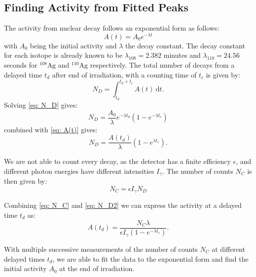 \subsection{Finding Activity from Fitted Peaks}
The activity from nuclear decay follows an exponential form as follows:
\begin{equation} \label{eq: A(t)}
  A(t) = A_0e^{-λt}
\end{equation}
with $A_0$ being the initial activity and $λ$ the decay constant. The decay constant for each isotope is already known to be $λ_{108} = 2.382$ minutes and $λ_{110} = 24.56$ seconds for $^{108}\text{Ag}$ and $^{110}\text{Ag}$ respectively. The total number of decays from a delayed time $t_d$ after end of irradiation, with a counting time of $t_c$ is given by:
\begin{equation} \label{eq: N_D}
  N_D = ∫_{t_d}^{t_d + t_c} A(t) \ \mathrm{d}t.
\end{equation}
Solving \cref{eq: N_D} gives:
\begin{equation}
  N_D = \frac{A_0}{λ}e^{-λt_d}\left(1 - e^{-λt_c}\right)
\end{equation}
combined with \cref{eq: A(t)} gives: 
\begin{equation} \label{eq: N_D2}
  N_{D} = \frac{A(t_d)}{λ}\left(1 - e^{λt_c}\right).
\end{equation}

We are not able to count every decay, as the detector has a finite efficiency $ϵ$, and different photon energies have different intensities $I_{γ}$. The number of counts $N_C$ is then given by:
\begin{equation} \label{eq: N_C}
  N_C = ϵI_{γ}N_D 
\end{equation}

Combining \cref{eq: N_C} and \cref{eq: N_D2} we can express the activity at a delayed time $t_d$ as:
\begin{equation} \label{eq: A(t_d)}
  A(t_d) = \frac{N_Cλ}{ϵI_{γ}\left(1 - e^{-λt_c}\right)}.
\end{equation}

With multiple successive measurements of the number of counts $N_C$ at different delayed times $t_d$, we are able to fit the data to the exponential form and find the initial activity $A_0$ at the end of irradiation. 
